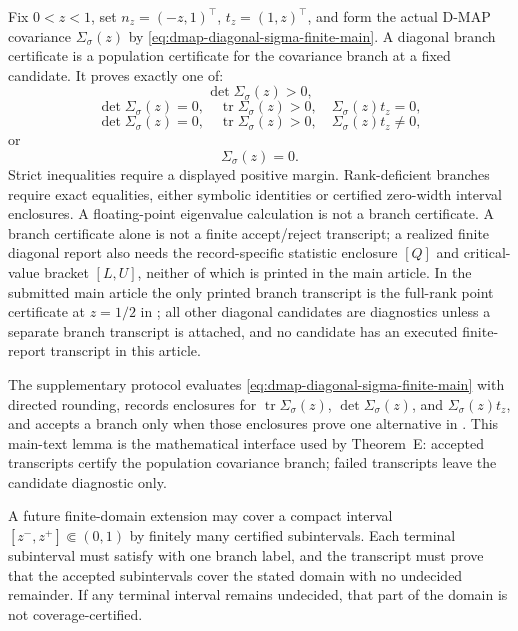\begin{definition}\label{def:dmap-diagonal-rank-certificate-main}
Fix \(0<z<1\), set \(n_z=(-z,1)^\top\), \(t_z=(1,z)^\top\), and form the
actual D-MAP covariance \(\Sigma_\sigma(z)\) by
\eqref{eq:dmap-diagonal-sigma-finite-main}.  A diagonal branch certificate is
a population certificate for the covariance branch at a fixed candidate.  It
proves exactly one of:
\[
\det\Sigma_\sigma(z)>0,
\]
\[
\det\Sigma_\sigma(z)=0,\quad
\operatorname{tr}\Sigma_\sigma(z)>0,\quad
\Sigma_\sigma(z)t_z=0,
\]
\[
\det\Sigma_\sigma(z)=0,\quad
\operatorname{tr}\Sigma_\sigma(z)>0,\quad
\Sigma_\sigma(z)t_z\ne0,
\]
or
\[
\Sigma_\sigma(z)=0.
\]
Strict inequalities require a displayed positive margin.  Rank-deficient
branches require exact equalities, either symbolic identities or certified
zero-width interval enclosures.  A floating-point eigenvalue calculation is
not a branch certificate.  A branch certificate alone is not a finite
accept/reject transcript; a realized finite diagonal report also needs the
record-specific statistic enclosure \([Q]\) and critical-value bracket
\([L,U]\), neither of which is printed in the main article.  In the submitted
main article the only printed branch transcript is
the full-rank point certificate at \(z=1/2\) in
; all other diagonal
candidates are diagnostics unless a separate branch transcript is attached,
and no candidate has an executed finite-report transcript in this article.
\end{definition}

\begin{algorithmiclemma}\label{lem:diagonal-interval-branch-certificate-main}
The supplementary protocol evaluates
\eqref{eq:dmap-diagonal-sigma-finite-main} with directed rounding, records
enclosures for \(\operatorname{tr}\Sigma_\sigma(z)\),
\(\det\Sigma_\sigma(z)\), and \(\Sigma_\sigma(z)t_z\), and accepts a branch
only when those enclosures prove one alternative in
.  This main-text lemma is the
mathematical interface used by Theorem~E: accepted transcripts certify the
population covariance branch; failed transcripts leave the candidate
diagnostic only.
\end{algorithmiclemma}

\begin{algorithmiclemma}\label{lem:diagonal-certified-interval-cover-main}
A future finite-domain extension may cover a compact interval
\([z^-,z^+]\Subset(0,1)\) by finitely many certified subintervals.  Each
terminal subinterval must satisfy
 with one branch label,
and the transcript must prove that the accepted subintervals cover the stated
domain with no undecided remainder.  If any terminal interval remains
undecided, that part of the domain is not coverage-certified.
\end{algorithmiclemma}


